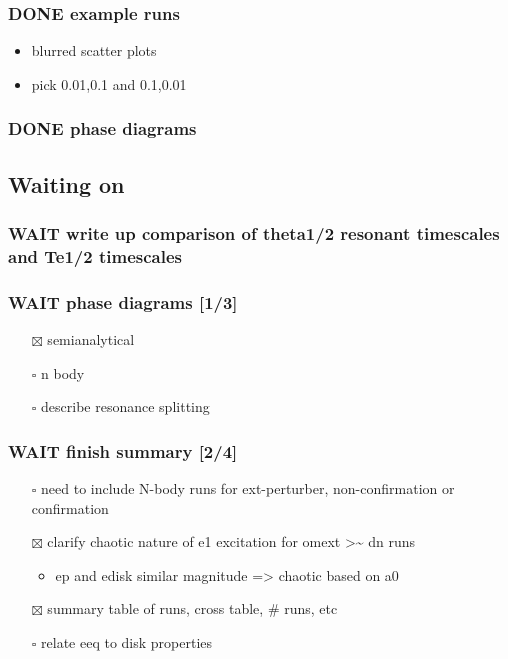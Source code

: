 \documentclass[11pt]{article}
\begin{document}
\subsubsection{{\bfseries\sffamily DONE} example runs}
\label{sec:org6efe4b5}
\begin{itemize}
\item blurred scatter plots
\item pick 0.01,0.1 and 0.1,0.01
\end{itemize}
\subsubsection{{\bfseries\sffamily DONE} phase diagrams}
\label{sec:org76b3ed6}
\subsection{Waiting on}
\label{sec:orgd7f89ff}
\subsubsection{{\bfseries\sffamily WAIT} write up comparison of theta1/2 resonant timescales and Te1/2 timescales}
\label{sec:orgb516dbc}
\subsubsection{{\bfseries\sffamily WAIT} phase diagrams [1/3]}
\label{sec:orge38c27d}
\begin{itemize}
\item[{$\boxtimes$}] semianalytical
\item[{$\square$}] n body
\item[{$\square$}] describe resonance splitting
\end{itemize}
\subsubsection{{\bfseries\sffamily WAIT} finish summary [2/4]}
\label{sec:org30e9651}
\begin{itemize}
\item[{$\square$}] need to include N-body runs for ext-perturber, non-confirmation or confirmation
\item[{$\boxtimes$}] clarify chaotic nature of e1 excitation for omext >\textasciitilde{} dn runs
\begin{itemize}
\item ep and edisk similar magnitude => chaotic based on a0
\end{itemize}
\item[{$\boxtimes$}] summary table of runs, cross table, \# runs, etc
\item[{$\square$}] relate eeq to disk properties
\end{itemize}
\end{document}
